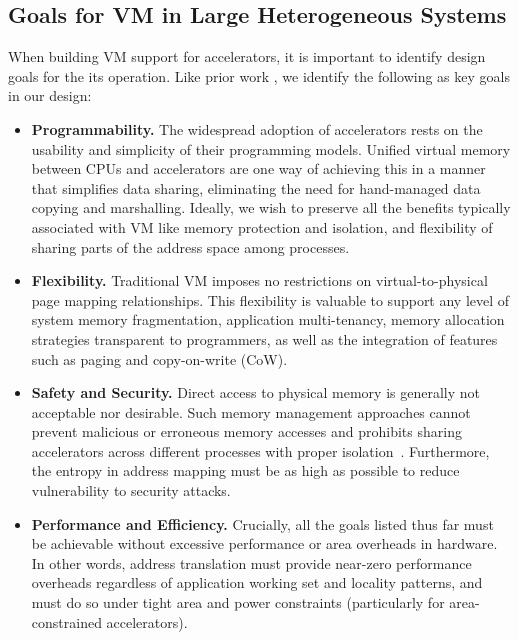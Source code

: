 \subsection{Goals for VM in Large Heterogeneous Systems}
When building VM support for accelerators, it is important to identify
design goals for the its operation. Like prior work
\cite{haria:devirtualizing}, we identify the following as key goals in
our design:

\begin{itemize}
        \item \textbf{Programmability.} The widespread adoption of
          accelerators rests on the usability and simplicity of their
          programming models. Unified virtual memory between CPUs and
          accelerators are one way of achieving this in a manner that
          simplifies data sharing, eliminating the need for
          hand-managed data copying and marshalling. Ideally, we wish
          to preserve all the benefits typically associated with VM
          like memory protection and isolation, and flexibility of
          sharing parts of the address space among processes.

        \item \textbf{Flexibility.} Traditional VM imposes no
          restrictions on virtual-to-physical page mapping
          relationships. This flexibility is valuable to support any level of
          system memory fragmentation, application multi-tenancy,
          memory allocation strategies transparent to programmers, as
          well as the integration of features such as paging and
          copy-on-write (CoW).

        \item \textbf{Safety and Security.} Direct access to physical
          memory is generally not acceptable nor desirable. Such
          memory management approaches cannot prevent malicious or
          erroneous memory accesses and prohibits sharing accelerators
          across different processes with proper
          isolation~\cite{haria:devirtualizing}. Furthermore, the
          entropy in address mapping must be as high as possible to
          reduce vulnerability to security attacks.

        \item \textbf{Performance and Efficiency.} Crucially, all the
          goals listed thus far must be achievable without excessive
          performance or area overheads in hardware. In other words,
          address translation must provide near-zero performance
          overheads regardless of application working set and locality
          patterns, and must do so under tight area and power
          constraints (particularly for area-constrained accelerators). 


\end{itemize}


